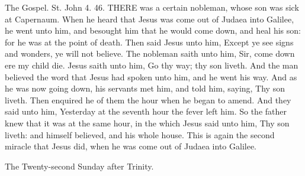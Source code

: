 The Gospel. St. John 4. 46.
THERE was a certain nobleman, whose son was sick at Capernaum. When he heard that Jesus was come out of Judaea into Galilee, he went unto him, and besought him that he would come down, and heal his son: for he was at the point of death. Then said Jesus unto him, Except ye see signs and wonders, ye will not believe. The nobleman saith unto him, Sir, come down ere my child die. Jesus saith unto him, Go thy way; thy son liveth. And the man believed the word that Jesus had spoken unto him, and he went his way. And as he was now going down, his servants met him, and told him, saying, Thy son liveth. Then enquired he of them the hour when he began to amend. And they said unto him, Yesterday at the seventh hour the fever left him. So the father knew that it was at the same hour, in the which Jesus said unto him, Thy son liveth: and himself believed, and his whole house. This is again the second miracle that Jesus did, when he was come out of Judaea into Galilee.


The Twenty-second Sunday after Trinity.
\subsection{}


